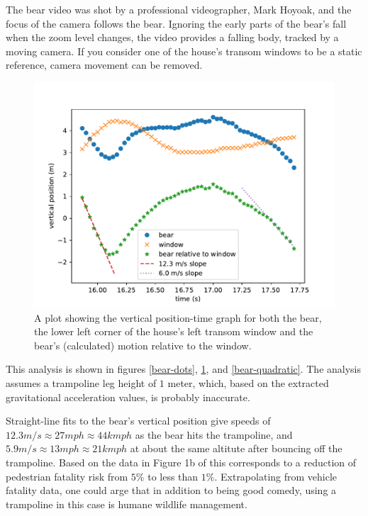 \documentclass[12pt]{iopart}
\begin{document}
The bear video was shot by a professional videographer, Mark Hoyoak, and the focus of the camera follows the bear.  Ignoring the early parts of the bear's fall when the zoom level changes, the video provides a falling body, tracked by a moving camera.  If you consider one of the house's transom windows to be a static reference, camera movement can be removed.

\begin{figure}[ht]
\centering
\includegraphics[width=\columnwidth]{figure_7_bear-speed.pdf}
\caption{
A plot showing the vertical position-time graph for both the bear, the lower left corner of the house's left transom window and the bear's (calculated)  motion relative to the window. 
}
\label{bear-speed}
\end{figure}

This analysis is shown in figures \ref{bear-dots}, \ref{bear-speed}, and \ref{bear-quadratic}.
The analysis assumes a trampoline leg height of $1$ meter, which, based on the extracted gravitational acceleration values, is probably inaccurate.
 
 Straight-line fits to the bear's vertical position give speeds of $12.3m/s\approx27mph\approx44kmph$ as the bear hits the trampoline, and $5.9m/s\approx13mph\approx21kmph$ at about the same altitute after bouncing off the trampoline.  Based on the data in Figure 1b of \cite{AccidentRisk} this corresponds to a reduction of pedestrian fatality risk from $5\%$ to less than $1\%$.  Extrapolating from vehicle fatality data, one could arge that in addition to being good comedy, using a trampoline in this case is humane wildlife management.     
     
\end{document}
